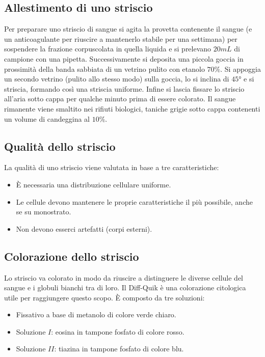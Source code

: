 	\subsection{Allestimento di uno striscio}
	Per preparare uno striscio di sangue si agita la provetta contenente il sangue (e un anticoagulante per riuscire a mantenerlo stabile per una settimana) per sospendere la frazione corpuscolata in quella liquida e si prelevano $20\si{mL}$ di campione con una pipetta.
	Successivamente si deposita una piccola goccia in prossimit\`a della banda sabbiata di un vetrino pulito con etanolo $70\%$.
	Si appoggia un secondo vetrino (pulito allo stesso modo) sulla goccia, lo si inclina di $45\si{\degree}$ e si striscia, formando cos\`i una striscia uniforme.
	Infine si lascia fissare lo striscio all'aria sotto cappa per qualche minuto prima di essere colorato.
	Il sangue rimanente viene smaltito nei rifiuti biologici, taniche grigie sotto cappa contenenti un volume di candeggina al $10\%$.

	\subsection{Qualit\`a dello striscio}
	La qualit\`a di uno striscio viene valutata in base a tre caratteristiche:
	\begin{itemize}
		\item \`E necessaria una distribuzione cellulare uniforme.
		\item Le cellule devono mantenere le proprie caratteristiche il pi\`u possibile, anche se su monostrato.
		\item Non devono esserci artefatti (corpi esterni).
	\end{itemize}

	\subsection{Colorazione dello striscio}
	Lo striscio va colorato in modo da riuscire a distinguere le diverse cellule del sangue e i globuli bianchi tra di loro. 
	Il Diff-Quik \`e una colorazione citologica utile per raggiungere questo scopo.
	\`E composto da tre soluzioni:
	\begin{itemize}
		\item Fissativo a base di metanolo di colore verde chiaro.
		\item Soluzione $I$: eosina in tampone fosfato di colore rosso.
		\item Soluzione $II$: tiazina in tampone fosfato di colore blu.
	\end{itemize}


